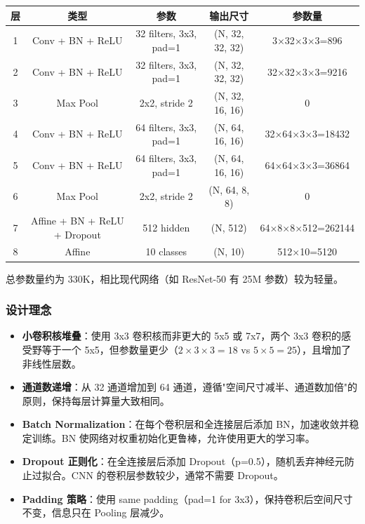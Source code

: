 \documentclass[a4paper]{article}
\begin{document}
\begin{center}
\begin{longtable}{c|c|c|c|c}
\toprule
\textbf{层} & \textbf{类型} & \textbf{参数} & \textbf{输出尺寸} & \textbf{参数量} \\
\midrule
1 & Conv + BN + ReLU & 32 filters, 3x3, pad=1 & (N, 32, 32, 32) & 3×32×3×3=896 \\
2 & Conv + BN + ReLU & 32 filters, 3x3, pad=1 & (N, 32, 32, 32) & 32×32×3×3=9216 \\
3 & Max Pool & 2x2, stride 2 & (N, 32, 16, 16) & 0 \\
4 & Conv + BN + ReLU & 64 filters, 3x3, pad=1 & (N, 64, 16, 16) & 32×64×3×3=18432 \\
5 & Conv + BN + ReLU & 64 filters, 3x3, pad=1 & (N, 64, 16, 16) & 64×64×3×3=36864 \\
6 & Max Pool & 2x2, stride 2 & (N, 64, 8, 8) & 0 \\
7 & Affine + BN + ReLU + Dropout & 512 hidden & (N, 512) & 64×8×8×512=262144 \\
8 & Affine & 10 classes & (N, 10) & 512×10=5120 \\
\bottomrule
\end{longtable}
\end{center}

总参数量约为 330K，相比现代网络（如 ResNet-50 有 25M 参数）较为轻量。

\subsubsection{设计理念}

\begin{itemize}
    \item \textbf{小卷积核堆叠}：使用 3x3 卷积核而非更大的 5x5 或 7x7，两个 3x3 卷积的感受野等于一个 5x5，但参数量更少（$2×3×3=18$ vs $5×5=25$），且增加了非线性层数。
    
    \item \textbf{通道数递增}：从 32 通道增加到 64 通道，遵循"空间尺寸减半、通道数加倍"的原则，保持每层计算量大致相同。
    
    \item \textbf{Batch Normalization}：在每个卷积层和全连接层后添加 BN，加速收敛并稳定训练。BN 使网络对权重初始化更鲁棒，允许使用更大的学习率。
    
    \item \textbf{Dropout 正则化}：在全连接层后添加 Dropout（p=0.5），随机丢弃神经元防止过拟合。CNN 的卷积层参数较少，通常不需要 Dropout。
    
    \item \textbf{Padding 策略}：使用 same padding（pad=1 for 3x3），保持卷积后空间尺寸不变，信息只在 Pooling 层减少。
\end{itemize}
\end{document}
